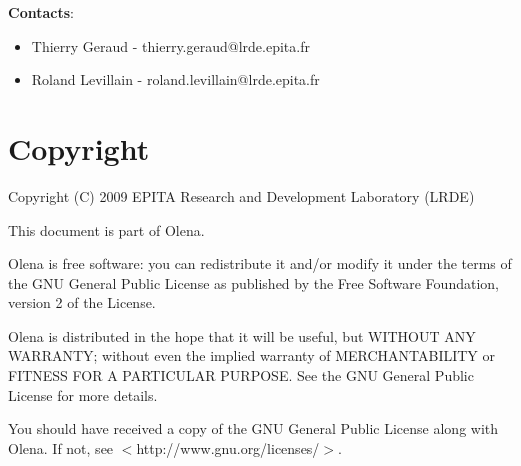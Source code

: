 \documentclass{article}
\begin{document}
%
\bigskip
%

\textbf{Contacts}:
\begin{itemize}
  \item Thierry Geraud - thierry.geraud@lrde.epita.fr
  \item Roland Levillain - roland.levillain@lrde.epita.fr
\end{itemize}



\section*{Copyright}
Copyright (C) 2009 EPITA Research and Development Laboratory (LRDE)

This document is part of Olena.

Olena is free software: you can redistribute it and/or modify it under
the terms of the GNU General Public License as published by the Free
Software Foundation, version 2 of the License.

Olena is distributed in the hope that it will be useful,
but WITHOUT ANY WARRANTY; without even the implied warranty of
MERCHANTABILITY or FITNESS FOR A PARTICULAR PURPOSE.  See the GNU
General Public License for more details.

You should have received a copy of the GNU General Public License
along with Olena.  If not, see $<$http://www.gnu.org/licenses/$>$.
\end{document}
